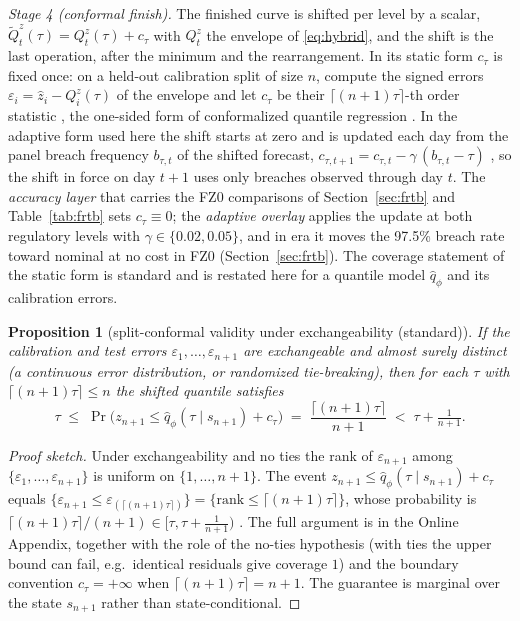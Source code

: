 \documentclass[11pt]{article}
\newtheorem{proposition}{Proposition}
\theoremstyle{remark}
\begin{document}
\emph{Stage 4 (conformal finish).} The finished curve is shifted per level by a scalar, $\widetilde{Q}^{z}_t(\tau) = Q^{z}_t(\tau) + c_\tau$ with $Q^{z}_t$ the envelope of \eqref{eq:hybrid}, and the shift is the last operation, after the minimum and the rearrangement. In its static form $c_\tau$ is fixed once: on a held-out calibration split of size $n$, compute the signed errors $\varepsilon_i = \widehat{z}_i - Q^{z}_i(\tau)$ of the envelope and let $c_\tau$ be their $\lceil (n{+}1)\tau \rceil$-th order statistic \citep{vovk2005, lei2018}, the one-sided form of conformalized quantile regression \citep{romano2019cqr}. In the adaptive form used here the shift starts at zero and is updated each day from the panel breach frequency $b_{\tau,t}$ of the shifted forecast, $c_{\tau,t+1} = c_{\tau,t} - \gamma\,(b_{\tau,t}-\tau)$ \citep{gibbs2021aci}, so the shift in force on day $t+1$ uses only breaches observed through day $t$. The \emph{accuracy layer} that carries the FZ0 comparisons of Section~\ref{sec:frtb} and Table~\ref{tab:frtb} sets $c_\tau\equiv0$; the \emph{adaptive overlay} applies the update at both regulatory levels with $\gamma\in\{0.02,0.05\}$, and in era it moves the 97.5\% breach rate toward nominal at no cost in FZ0 (Section~\ref{sec:frtb}). The coverage statement of the static form is standard \citep{vovk2005, lei2018, romano2019cqr} and is restated here for a quantile model $\widehat{q}_\phi$ and its calibration errors.

\begin{proposition}[split-conformal validity under
exchangeability (standard)]\label{prop:conformal}
If the calibration and test errors $\varepsilon_1,\dots,\varepsilon_{n+1}$ are
exchangeable and almost surely distinct (a continuous error
distribution, or randomized tie-breaking), then for each $\tau$ with
$\lceil(n{+}1)\tau\rceil \le n$ the shifted quantile satisfies
\[
\tau \;\le\; \Pr\big(z_{n+1} \le \widehat{q}_\phi(\tau \mid s_{n+1}) + c_\tau\big)
\;=\; \frac{\lceil(n{+}1)\tau\rceil}{n+1}
\;<\; \tau + \tfrac{1}{n+1}.
\]
\end{proposition}
\begin{proof}[Proof sketch]
Under exchangeability and no ties the rank of $\varepsilon_{n+1}$ among
$\{\varepsilon_1,\dots,\varepsilon_{n+1}\}$ is uniform on $\{1,\dots,n+1\}$. The event
$z_{n+1}\le\widehat{q}_\phi(\tau\mid s_{n+1})+c_\tau$ equals $\{\varepsilon_{n+1}\le
\varepsilon_{(\lceil(n+1)\tau\rceil)}\}=\{\mathrm{rank}\le\lceil(n{+}1)\tau\rceil\}$,
whose probability is $\lceil(n{+}1)\tau\rceil/(n+1)\in[\tau,\tau+\tfrac1{n+1})$
\citep{vovk2005}. The full argument is in the Online Appendix, together with the role of the no-ties hypothesis (with ties the upper bound can fail, e.g.\ identical residuals give coverage $1$) and the boundary convention $c_\tau=+\infty$ when $\lceil(n{+}1)\tau\rceil=n+1$. The guarantee is marginal over the state $s_{n+1}$ rather than state-conditional.
\end{proof}
\end{document}
